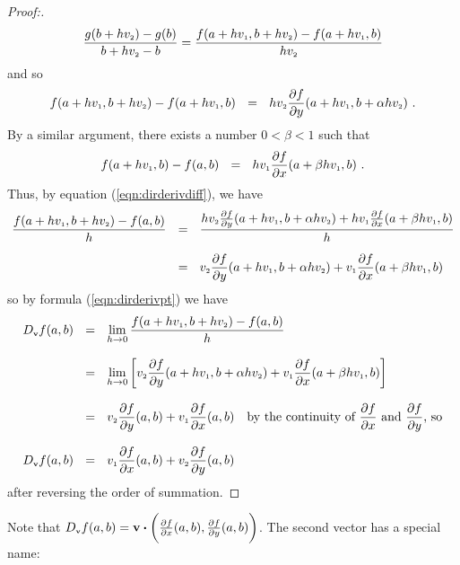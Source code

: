 \begin{proofbar}
\begin{proof}[Proof:]
\begin{displaymath}
   \frac{g(b+hv_{\scriptscriptstyle 2}) - g(b)}{b+hv_{\scriptscriptstyle 2} - b} =
   \frac{f(a+hv_{\scriptscriptstyle 1},b+hv_{\scriptscriptstyle 2}) - f(a+hv_{\scriptscriptstyle 1},b)}{hv_{\scriptscriptstyle 2}}
 \end{displaymath}
 and so
 \begin{displaymath}
  f(a+hv_{\scriptscriptstyle 1},b+hv_{\scriptscriptstyle 2}) - f(a+hv_{\scriptscriptstyle 1},b) ~~=~~ hv_{\scriptscriptstyle 2} 
   \frac{\partial f}{\partial y}(a+hv_{\scriptscriptstyle 1},b+\alpha hv_{\scriptscriptstyle 2}) ~.
 \end{displaymath}
 By a similar argument, there exists a number $0 < \beta < 1$ such that
 \begin{displaymath}
  f(a+hv_{\scriptscriptstyle 1},b) - f(a,b) ~~=~~ hv_{\scriptscriptstyle 1} \frac{\partial f}{\partial x}(a+\beta hv_{\scriptscriptstyle 1},b) ~.
 \end{displaymath}
 Thus, by equation (\ref{eqn:dirderivdiff}), we have
 \begin{align*}
  \frac{f(a+hv_{\scriptscriptstyle 1},b+hv_{\scriptscriptstyle 2}) - f(a,b)}{h} ~~ &= ~~
   \frac{hv_{\scriptscriptstyle 2}\tfrac{\partial f}{\partial y}(a+hv_{\scriptscriptstyle 1},b+\alpha hv_{\scriptscriptstyle 2}) +
    hv_{\scriptscriptstyle 1} \tfrac{\partial f}{\partial x}(a+\beta hv_{\scriptscriptstyle 1},b)}{h}\\[6pt]
   &= ~~ v_{\scriptscriptstyle 2}\frac{\partial f}{\partial y}(a+hv_{\scriptscriptstyle 1},b+\alpha hv_{\scriptscriptstyle 2}) +
    v_{\scriptscriptstyle 1} \frac{\partial f}{\partial x}(a+\beta hv_{\scriptscriptstyle 1},b)
 \end{align*}
 so by formula (\ref{eqn:dirderivpt}) we have
 \begin{align*}
  D_{\scriptscriptstyle \textbf{v}}f(a,b) ~~ &= ~~ \lim_{h \to 0} \dfrac{f(a+hv_{\scriptscriptstyle 1},b+hv_{\scriptscriptstyle 2}) - f(a,b)}{h}\\[8pt]
   &= ~~ \lim_{h \to 0} \left[ v_{\scriptscriptstyle 2}\frac{\partial f}{\partial y}(a+hv_{\scriptscriptstyle 1},b+\alpha hv_{\scriptscriptstyle 2}) +
    v_{\scriptscriptstyle 1} \frac{\partial f}{\partial x}(a+\beta hv_{\scriptscriptstyle 1},b) \right]\\[8pt]
   &= ~~ v_{\scriptscriptstyle 2}\frac{\partial f}{\partial y}(a,b) +
    v_{\scriptscriptstyle 1}\frac{\partial f}{\partial x}(a,b) \text{~~~by the continuity of $\frac{\partial f}{\partial x}$ and
     $\frac{\partial f}{\partial y}$, so}\\[8pt]
   D_{\scriptscriptstyle \textbf{v}}f(a,b) ~~ &= ~~ v_{\scriptscriptstyle 1}\frac{\partial f}{\partial x}(a,b) +
    v_{\scriptscriptstyle 2}\frac{\partial f}{\partial y}(a,b)
 \end{align*}
 after reversing the order of summation.\vspace{-3mm}
\end{proof}\end{proofbar}

Note that $D_{\scriptscriptstyle \textbf{v}}f(a,b) = \textbf{v} \bm{\cdot} \biggl(\frac{\partial f}{\partial x}(a,b),
\frac{\partial f}{\partial y}(a,b)\biggr)$. The second vector has a special name:


